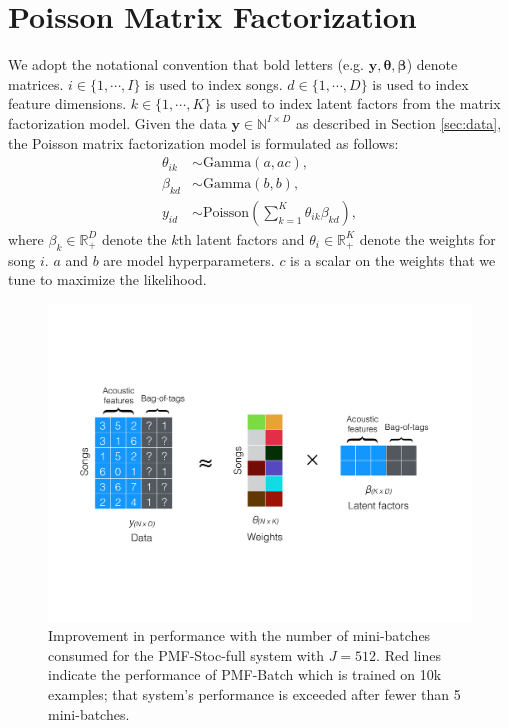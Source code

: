 \section{Poisson Matrix Factorization}\label{sec:pmf}
We adopt the notational convention that bold letters (e.g. $\boldsymbol{y}, \boldsymbol{\theta}, \boldsymbol{\beta}$) denote matrices. $i \in \{1, \cdots, I\}$ is used to index songs. $d \in \{1, \cdots, D\}$ is used to index feature dimensions. $k \in \{1, \cdots, K\}$ is used to index latent factors from the matrix factorization model. Given the data $\boldsymbol{y}\in \mathbb{N}^{I\times D}$ as described in Section \ref{sec:data}, the Poisson matrix factorization model is formulated as follows:
\begin{equation} \label{eq:model} 
\begin{split}
\theta_{ik} &\sim \text{Gamma}(a, ac),\\
\beta_{kd} &\sim \text{Gamma}(b, b),\\
y_{id} &\sim \text{Poisson}( \textstyle\sum_{k=1}^K \theta_{ik} \beta_{kd}),
\end{split}
\end{equation}
where $\beta_k \in \mathbb{R}_+^{D}$ denote the $k$th latent factors and $\theta_i \in \mathbb{R}_{+}^{K}$ denote the weights for song $i$. $a$ and $b$ are model hyperparameters. $c$ is a scalar on the weights that we tune to maximize the likelihood. 

\begin{figure}
  \centering
    \includegraphics[width=\textwidth]{fig/pmf_tagging}
      \caption{Improvement in performance with the number of mini-batches consumed for the PMF-Stoc-full system with $J=512$.  Red lines indicate the performance of PMF-Batch which is trained on 10k 
      examples; that system's performance is exceeded after fewer than 5 mini-batches.}
      \label{fig:performance}
\end{figure}

